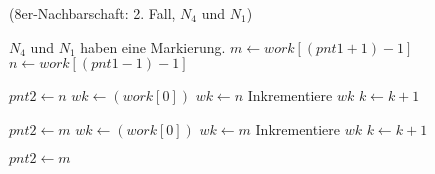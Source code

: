 \begin{algorithm}[ht]
\caption{ (8er-Nachbarschaft: 2. Fall, $N_4$ und $N_1$)}
\label{alg:arlabeling-neighbour-case2-2}
\begin{algorithmic}[1]
	\State \Comment $N_4$ und $N_1$ haben eine Markierung.
	\State $m \gets \mathit{work}\left[\left(\mathit{pnt1} + 1\right) - 1\right]$ 
	\State $n \gets \mathit{work}\left[\left(\mathit{pnt1} - 1\right) - 1\right]$ 

	 
		\State $\mathit{pnt2} \gets n$ 
		\State $\mathit{wk} \gets \left(\mathit{work}\left[0\right]\right)$ 
		 
			 
				\State $\mathit{wk} \gets n$ 
			\EndIf
			\State Inkrementiere $\mathit{wk}$ 
			\State $k \gets k + 1$ 
		\EndFor

		\State $\mathit{pnt2} \gets m$
		\State $\mathit{wk} \gets \left(\mathit{work}\left[0\right]\right)$
				\State $\mathit{wk} \gets m$
			\EndIf
			\State Inkrementiere $\mathit{wk}$
			\State $k \gets k + 1$
		\EndFor

	\Else
		\State $\mathit{pnt2} \gets m$
	\EndIf
\end{algorithmic}
\end{algorithm}
